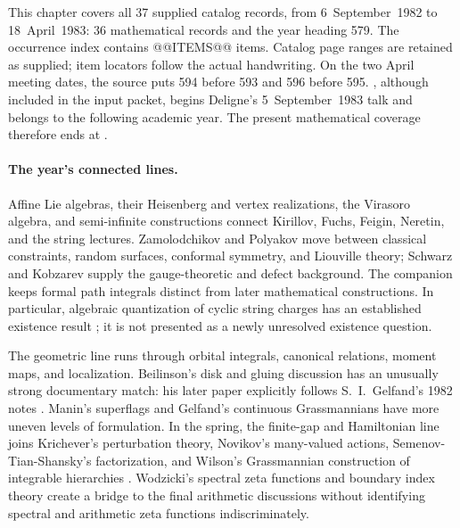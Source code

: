 \noindent This chapter covers all 37 supplied catalog records, from
6~September~1982 to 18~April~1983: 36 mathematical records and the year heading
579. The occurrence index contains @@ITEMS@@ items. Catalog page ranges are
retained as supplied; item locators follow the actual handwriting. On the two
April meeting dates, the source puts 594 before 593 and 596 before 595.
, although included in the input packet, begins Deligne's
5~September~1983 talk and belongs to the following academic year. The present
mathematical coverage therefore ends at .

\paragraph{The year's connected lines.}
Affine Lie algebras, their Heisenberg and vertex realizations, the Virasoro
algebra, and semi-infinite constructions connect Kirillov, Fuchs, Feigin,
Neretin, and the string lectures. Zamolodchikov and Polyakov move between
classical constraints, random surfaces, conformal symmetry, and Liouville
theory; Schwarz and Kobzarev supply the gauge-theoretic and defect background.
The companion keeps formal path integrals distinct from later mathematical
constructions. In particular, algebraic quantization of cyclic string charges
has an established existence result
\citep{enriquezhalbout2010quantization,bahnsmeinecke2011string}; it is not
presented as a newly unresolved existence question.

The geometric line runs through orbital integrals, canonical relations,
moment maps, and localization. Beilinson's disk and gluing discussion has an
unusually strong documentary match: his later paper explicitly follows
S.~I.~Gelfand's 1982 notes \citep[introduction]{beilinson1987glue}.
Manin's superflags and Gelfand's continuous Grassmannians have more uneven
levels of formulation. In the spring, the finite-gap and Hamiltonian line
joins Krichever's perturbation theory, Novikov's many-valued actions,
Semenov-Tian-Shansky's factorization, and Wilson's Grassmannian construction
of integrable hierarchies \citep{krichever1983hessians,semenov1983classical,segalwilson1985loop}.
Wodzicki's spectral zeta functions and boundary index theory create a bridge
to the final arithmetic discussions without identifying spectral and
arithmetic zeta functions indiscriminately.

